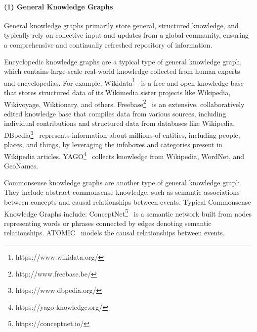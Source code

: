 \documentclass[acmsmall]{acmart}
\begin{document}
\paragraph{(1) General Knowledge Graphs} General knowledge graphs primarily store general, structured knowledge, and typically rely on collective input and updates from a global community, ensuring a comprehensive and continually refreshed repository of information.

Encyclopedic knowledge graphs are a typical type of general knowledge graph, which contains large-scale real-world knowledge collected from human experts and encyclopedias. For example, Wikidata\footnote{https://www.wikidata.org/}~\cite{ref:wikidata} is a free and open knowledge base that stores structured data of its Wikimedia sister projects like Wikipedia, Wikivoyage, Wiktionary, and others. Freebase\footnote{http://www.freebase.be/}~\cite{ref:freebase} is an extensive, collaboratively edited knowledge base that compiles data from various sources, including individual contributions and structured data from databases like Wikipedia. DBpedia\footnote{https://www.dbpedia.org/}~\cite{ref:dbpedia} represents information about millions of entities, including people, places, and things, by leveraging the infoboxes and categories present in Wikipedia articles.
YAGO\footnote{https://yago-knowledge.org/}~\cite{ref:yago} collects knowledge from Wikipedia, WordNet, and GeoNames.

Commonsense knowledge graphs are another type of general knowledge graph. They include abstract commonsense knowledge, such as semantic associations between concepts and causal relationships between events. Typical Commonsense Knowledge Graphs include: ConceptNet\footnote{https://conceptnet.io/}~\cite{ref:conceptnet} is a semantic network built from nodes representing words or phrases connected by edges denoting semantic relationships. ATOMIC~\cite{ref:atomic,ref:atomic2} models the causal relationships between events.
\end{document}
